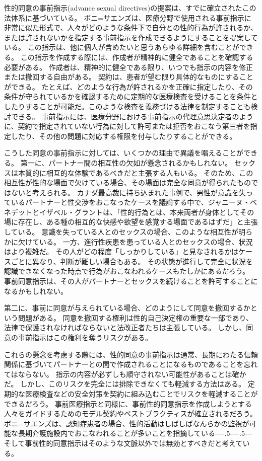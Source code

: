 \documentclass[paper=a4,book,openany]{jlreq}
\def\DDASH{―\kern-.5\zw―\kern-.5\zw―} %
\begin{document}
性的同意の事前指示(advance sexual directives)の提案は、すでに確立されたこの法体系に基づいている。
ボニ=サエンズは、医療分野で使用される事前指示に非常に似た形式で、人々がどのような条件下で自分との性的行為が許されるか、または許されないかを指定する事前指示を作成できるようにすることを提案している\citep{boni-saenz15:_sexual_incap}。
この指示は、他に個人が含めたいと思うあらゆる詳細を含むことができる。
この指示を作成する際には、作成者が精神的に健全であることを確認する必要がある。
作成者は、精神的に健全である限り、いつでも指示の内容を修正または撤回する自由がある。
契約は、患者が望む限り具体的なものにすることができる。
たとえば、どのような行為が許されるかを正確に指定したり、その条件が守られているかを確認するために定期的な医療検査を受けることを条件としたりすることが可能だ。このような検査を義務づける法律を制定することも検討できる。
事前指示には、医療分野における事前指示の代理意思決定者のように、契約で指定されていない行為に対して許可または拒否をおこなう第三者を指定したり、その他の問題に対応する権限を付与したりすることができる。

こうした同意の事前指示に対しては、いくつかの理由で異議を唱えることができる。
第一に、パートナー間の相互性の欠如が懸念されるかもしれない。
セックスは本質的に相互的な体験であるべきだと主張する人もいる。
そのため、この相互性が性的な場面で欠けている場合、その場面は完全な同意が得られたものではないと考えられる。
カナダ最高裁に持ち込まれた事例で、男性が意識を失っているパートナーと性交渉をおこなったケースを議論する中で、ジャニーヌ・ベネデットとイザベル・グラントは、「性的行為とは、本来両者が身体としてその場に存在し、ある種の相互的な快感や欲望を感覚する場面であるはずだ」と主張している\citep[p.80]{benedet10:confusing}。
意識を失っている人とのセックスの場合、このような相互性が明らかに欠けている。
一方、進行性疾患を患っている人とのセックスの場合、状況はより複雑だ。
その人がどの程度「しっかりしている」と見なされるかはケースごとに異なり、判断が難しい場合もある。
その状態が進行して完全に状況を認識できなくなった時点で行為がおこなわれるケースもたしかにあるだろう。
事前同意指示は、その人がパートナーとセックスを続けることを許可することになるかもしれない。

第二に、事前に同意が与えられている場合、どのようにして同意を撤回するかという問題がある。
同意を撤回する権利は性的自己決定権の重要な一部であり、法律で保護されなければならないと法改正者たちは主張している。
しかし、同意の事前指示はこの権利を奪うリスクがある。

これらの懸念を考慮する際には、性的同意の事前指示は通常、長期にわたる信頼関係に基づいてパートナーとの間で作成されることになるものであることを忘れてはならない。
指示の内容が必ずしも順守されない可能性があることは確かだ。
しかし、このリスクを完全には排除できなくても軽減する方法はある。
定期的な医療検査などの安全対策を契約に組み込むことでリスクを軽減することができるだろう。
事前医療指示と同様に、事前性的同意指示を作成しようとする人々をガイドするためのモデル契約やベストプラクティスが確立されるだろう。
ボニ=サエンズは、認知症患者の場合、性的活動はしばしばなんらかの監視が可能な長期介護施設内でおこなわれることが多いことを指摘している{\DDASH}そして事前性的同意指示はそのような文脈以外では無効とすべきだと考えている\citep[p.43]{boni-saenz15:_sexual_incap}。
\end{document}
